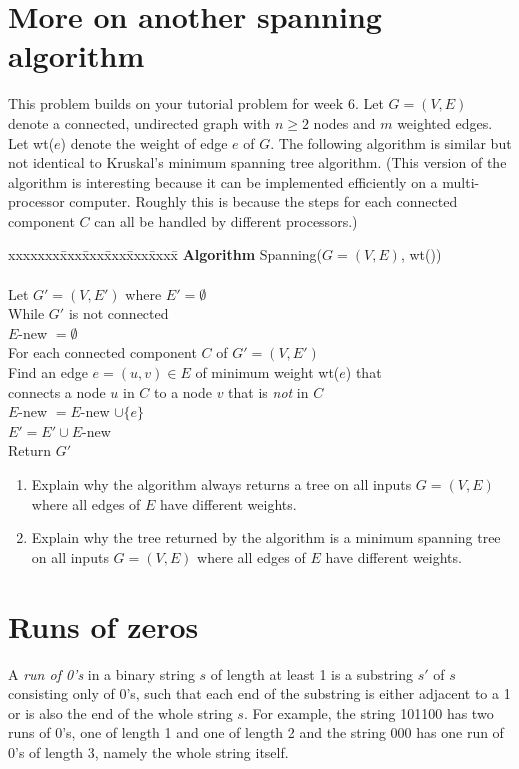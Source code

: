 \documentclass[11pt]{article}
\def\question#1{\red{#1}}
\def\red#1{{\color{red}#1}}
\begin{document}
\section{More on another spanning algorithm}
\label{sec-2}
This problem builds on your tutorial problem for week 6. 
Let $G = (V,E)$ denote a connected, undirected graph with $n\ge 2$
nodes and $m$ weighted edges. Let wt($e$) denote the weight of edge
$e$ of $G$. The following algorithm is similar but not identical to
Kruskal's minimum spanning tree algorithm. (This version of the
algorithm is interesting because it can be implemented efficiently
on a multi-processor computer. Roughly this is because the steps
for each connected component $C$ can all be handled by different processors.)

\begin{tabbing}
xxxxxxx\=xxx\=xxx\=xxx\=xxx\=xxxx\= \kill
\> {\bf Algorithm} Spanning($G = (V,E)$, wt()) \\
\>\>    \\
\>\> Let $G'= (V,E')$ where $E' = \emptyset$ \\
\>\> While $G'$ is not connected \\
\>\>\> $E$-new $= \emptyset$ \\
\>\>\>  For each connected component $C$ of $G' = (V, E')$ \\
\>\>\>\>   Find an edge $e =(u,v) \in E$ of minimum weight wt($e$) that \\
\>\>\>\>   connects a node $u$ in $C$ to a node $v$ that is {\em not} in $C$ \\
\>\>\>\>   $E$-new $= E$-new $\cup \{e\}$ \\
\>\>\> $E' = E' \cup E$-new \\
\>\> Return $G'$ \\
\end{tabbing}

\begin{enumerate}
\item \question{Explain why the algorithm always returns a tree on all inputs $G = (V,E)$ where all edges of $E$ have different weights.}

\item \question{Explain why the tree returned by the algorithm is a minimum spanning tree on all inputs $G = (V,E)$ where all edges of $E$ have different weights.}
\end{enumerate}

\section{Runs of zeros}
\label{sec-3}
A \emph{run of 0's} in a binary string $s$ of length at least 1 is a substring $s'$ of $s$ consisting
only of 0's, such that each end of the substring is either adjacent
to a 1 or is also the end of the whole string $s$. For example,
the string 101100 has two runs of 0's, one of length 1 and one of
length 2 and the string 000 has one run of 0's of length 3, namely
the whole string itself.
\end{document}
